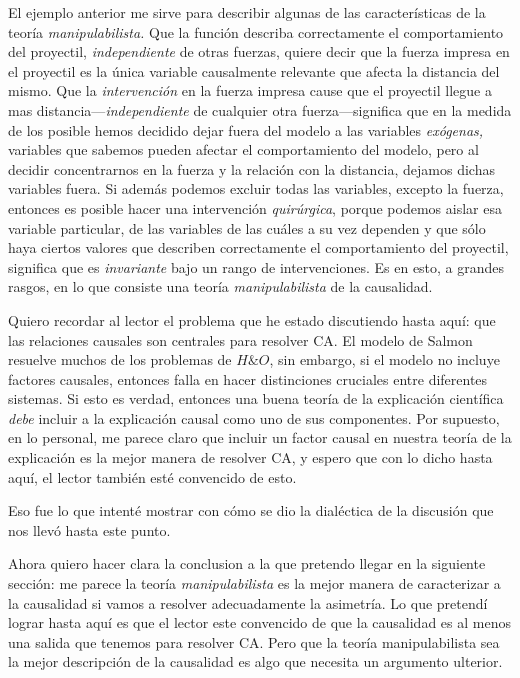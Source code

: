 El ejemplo anterior me sirve para describir algunas de las
características de la teoría \emph{manipulabilista.} Que la
función describa correctamente el comportamiento del
proyectil, \emph{independiente} de otras fuerzas, quiere
decir que la fuerza impresa en el proyectil es la única
variable causalmente relevante que afecta la distancia del
mismo. Que la \emph{intervención} en la fuerza impresa
cause que el proyectil llegue a mas
distancia---\emph{independiente} de cualquier otra
fuerza---significa que en la medida de los posible hemos
decidido dejar fuera del modelo a las variables
\emph{exógenas,} variables que sabemos pueden afectar el
comportamiento del modelo, pero al decidir concentrarnos en
la fuerza y la relación con la distancia, dejamos dichas
variables fuera. Si además podemos excluir todas las
variables, excepto la fuerza, entonces es posible hacer una
intervención \emph{quirúrgica}, porque podemos aislar esa
variable particular, de las variables de las cuáles a su vez
dependen y que sólo haya ciertos valores que describen
correctamente el comportamiento del proyectil, significa que
es \emph{invariante} bajo un rango de intervenciones. Es en
esto, a grandes rasgos, en lo que consiste una teoría
\emph{manipulabilista} de la causalidad.

Quiero recordar al lector el problema que he estado
discutiendo hasta aquí: que las
relaciones causales son centrales para resolver CA. El
modelo de Salmon resuelve muchos de los problemas de $H \&
O$, sin embargo, si el modelo no incluye factores causales,
entonces falla en hacer distinciones cruciales entre
diferentes sistemas. Si esto
es verdad, entonces una buena teoría de la explicación
científica \emph{debe} incluir a la explicación causal como
uno de sus componentes. Por supuesto, en lo personal, me
parece claro que incluir un factor causal en nuestra teoría
de la explicación es la mejor manera de resolver CA, y
espero que con lo dicho hasta aquí, el lector
también esté convencido de esto.

Eso fue lo que
intenté mostrar con cómo se dio la dialéctica de la discusión
que nos llevó hasta este punto.

Ahora quiero hacer clara la conclusion a la que pretendo
llegar en la siguiente sección: me parece la teoría
\emph{manipulabilista} es la mejor manera de caracterizar a
la causalidad si vamos a resolver adecuadamente la
asimetría. Lo que pretendí lograr hasta aquí es que el
lector este convencido de que la causalidad es al menos una
salida que tenemos para resolver CA. Pero que la teoría
manipulabilista sea la mejor descripción de la causalidad es
algo que necesita un argumento ulterior. 

